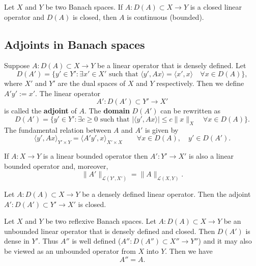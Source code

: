 \begin{theorem}
Let $X$ and $Y$ be two Banach spaces. If $A: D(A)\subset X\to Y$ is a closed linear operator and \textcolor[rgb]{1.00,0.00,0.00}{$D(A)$ is closed}, then \textcolor[rgb]{1.00,0.00,0.00}{$A$ is continuous (bounded)}.
\end{theorem}



\subsection{Adjoints in Banach spaces}
\begin{definition}[Adjoint $A'$]
Suppose $A: D(A)\subset X\to Y$ be a linear operator that is densely defined. Let
\[
D(A')=\{y'\in Y': \exists x'\in X' \textrm{ such that } \langle y', Ax\rangle=\langle x', x\rangle\quad \forall x\in D(A)\},
\]
where $X'$ and $Y'$ are the dual spaces of $X$ and $Y$ respectively.
Then we define $A'y':=x'$. The linear operator
\[
A': D(A')\subset Y'\to X'
\]
is called the \textbf{adjoint} of $A$. The \textbf{domain} $D(A')$ can be rewritten as
\[
D(A')=\{y'\in Y': \exists c\geq0 \textrm{ such that } |\langle y', Ax\rangle|\leq c\|x\|_X\quad \forall x\in D(A)\}.
\]
The fundamental relation between $A$ and $A'$ is given by
\[
\langle y', Ax \rangle_{Y'\times Y}=\langle A'y', x \rangle_{X'\times X}\quad\quad\forall x\in D(A),\quad y'\in D(A').
\]
\end{definition}

\begin{lemma}
If $A: X\to Y$ is a linear bounded operator then $A': Y'\to X'$ is also a linear bounded operator and, moreover,
\[
\|A'\|_{\mathcal L(Y', X')}=\|A\|_{\mathcal L(X, Y)}.
\]
\end{lemma}


\begin{lemma}
Let $A: D(A)\subset X\to Y$ be a densely defined linear operator. Then \textcolor[rgb]{1.00,0.00,0.00}{the adjoint $A': D(A')\subset Y'\to X'$ is closed}.
\end{lemma}

\begin{theorem}
Let $X$ and $Y$ be two \textcolor[rgb]{1.00,0.00,0.00}{reflexive} Banach spaces. Let $A: D(A)\subset X\to Y$ be an unbounded linear operator that is densely defined and closed. Then \textcolor[rgb]{1.00,0.00,0.00}{$D(A')$ is dense in $Y'$}. Thus $A''$ is well defined ($A'': D(A'')\subset X''\to Y''$) and it may
also be viewed as an unbounded operator from $X$ into $Y$. Then we have
\[
A''=A.
\]
\end{theorem}

